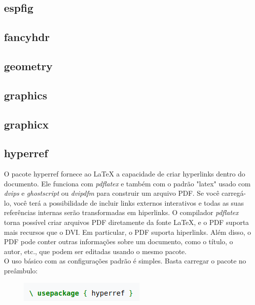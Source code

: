 \documentclass[12pt]{article}
\begin{document}
		\subsection{espfig}
		
		\subsection{fancyhdr}
		
		\subsection{geometry}
		
		\subsection{graphics}
		
		\subsection{graphicx}
		
		\subsection{hyperref}
			O pacote hyperref fornece ao LaTeX a capacidade de criar hyperlinks dentro do documento. Ele funciona com \textit{pdflatex} e também com o padrão "latex" usado com \textit{dvips} e \textit{ghostscript} ou \textit{dvipdfm} para construir um arquivo PDF. Se você carregá-lo, você terá a possibilidade de incluir links externos interativos e todas as suas referências internas serão transformadas em hiperlinks. O compilador \textit{pdflatex} torna possível criar arquivos PDF diretamente da fonte LaTeX, e o PDF suporta mais recursos que o DVI. Em particular, o PDF suporta hiperlinks. Além disso, o PDF pode conter outras informações sobre um documento, como o título, o autor, etc., que podem ser editadas usando o mesmo pacote.\\
			O uso básico com as configurações padrão é simples. Basta carregar o pacote no preâmbulo:
			\begin{figure}[h]
				\centering
				\includegraphics[scale=0.6]{caa.png}
			\end{figure}
		
\end{document}
